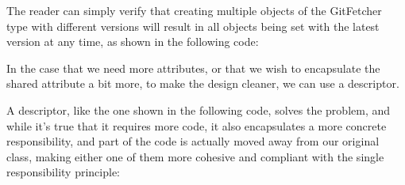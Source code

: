 \documentclass[a4paper,10pt,english]{sphinxmanual}
\begin{document}
The reader can simply verify that creating multiple objects of the GitFetcher type with
different versions will result in all objects being set with the latest version at any time, as
shown in the following code:

\begin{sphinxVerbatim}[commandchars=\\\{\}]
  
  
  
\end{sphinxVerbatim}

In the case that we need more attributes, or that we wish to encapsulate the shared attribute
a bit more, to make the design cleaner, we can use a descriptor.

A descriptor, like the one shown in the following code, solves the problem, and while it’s
true that it requires more code, it also encapsulates a more concrete responsibility, and part
of the code is actually moved away from our original class, making either one of them more
cohesive and compliant with the single responsibility principle:
\end{document}
